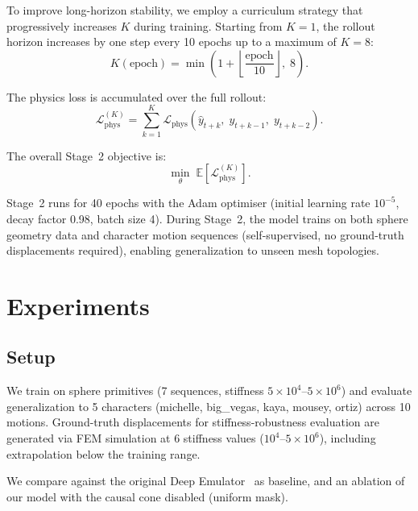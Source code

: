 \documentclass[10pt,twocolumn]{article}
\begin{document}
To improve long-horizon stability, we employ a curriculum strategy that progressively increases $K$ during training. Starting from $K=1$, the rollout horizon increases by one step every 10 epochs up to a maximum of $K=8$:
\begin{equation}
    K(\mathrm{epoch}) = \min\!\left(1 + \left\lfloor \frac{\mathrm{epoch}}{10} \right\rfloor,\; 8\right).
\end{equation}

The physics loss is accumulated over the full rollout:
\begin{equation}
    \mathcal{L}_{\mathrm{phys}}^{(K)} = \sum_{k=1}^{K} \mathcal{L}_{\mathrm{phys}}(\hat{y}_{t+k},\; y_{t+k-1},\; y_{t+k-2}).
\end{equation}

The overall Stage~2 objective is:
\begin{equation}
    \min_\theta\; \mathbb{E}\!\left[\mathcal{L}_{\mathrm{phys}}^{(K)}\right].
\end{equation}

Stage~2 runs for 40 epochs with the Adam optimiser (initial learning rate $10^{-5}$, decay factor 0.98, batch size 4). During Stage~2, the model trains on both sphere geometry data and character motion sequences (self-supervised, no ground-truth displacements required), enabling generalization to unseen mesh topologies.

\section{Experiments}

\subsection{Setup}

We train on sphere primitives (7 sequences, stiffness $5\!\times\!10^4$--$5\!\times\!10^6$) and evaluate generalization to 5 characters (michelle, big\_vegas, kaya, mousey, ortiz) across 10 motions. Ground-truth displacements for stiffness-robustness evaluation are generated via FEM simulation at 6 stiffness values ($10^4$--$5\!\times\!10^6$), including extrapolation below the training range.

We compare against the original Deep Emulator~\cite{zheng2021deep} as baseline, and an ablation of our model with the causal cone disabled (uniform mask).
\end{document}
